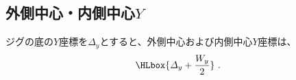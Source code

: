 \subsection{外側中心・内側中心\texorpdfstring{$Y$}{Y}}
ジグの底の$Y$座標を$\varDelta_y$とすると、外側中心および内側中心$Y$座標は、
\begin{align*}
  \HLbox{\varDelta_y+\frac{W_y}2}\ .
\end{align*}
